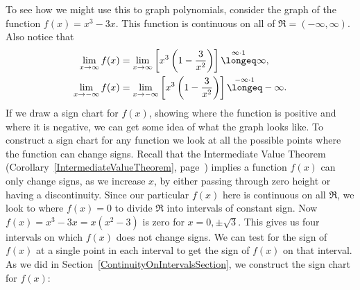 \bex\label{XXX-3XExample}
To see how we might use this to graph polynomials, consider
the graph of the function $f(x)=x^3-3x$.
This function is continuous on all of $\Re=(-\infty,\infty)$.
Also notice that
\begin{align*}
\lim_{x\to\infty}f(x)&=\lim_{x\to\infty}\left[x^3\left(1-\frac3{x^2}\right)
               \right]\overset{\infty\cdot1}{\longeq}\infty,\\
\lim_{x\to-\infty}f(x)&=\lim_{x\to-\infty}\left[x^3\left(1-\frac3{x^2}\right)
               \right]\overset{-\infty\cdot1}{\longeq}-\infty.\end{align*}
If we draw a sign chart for $f(x)$, showing where the function
is positive and where it is negative, we can get some
idea of what the graph looks like.  To construct a sign chart
for any function we look at all the
possible points where the function can change signs. Recall that
the Intermediate Value Theorem (Corollary~\ref{IntermediateValueTheorem},
page~\pageref{IntermediateValueTheorem})
implies a function $f(x)$ can only change signs, as we increase $x$,
by either passing through zero height or having a discontinuity.
Since our particular $f(x)$ here is continuous on all $\Re$,
we look to where $f(x)=0$ to divide $\Re$ into intervals of constant sign.
Now $f(x)=x^3-3x=x(x^2-3)$ is zero for $x=0,\pm\sqrt3$.  This
gives us four intervals on which $f(x)$ does not change signs.
We can test for the sign of $f(x)$ at a single point in each interval
to get the sign of $f(x)$ on that interval.  As we did 
in Section~\ref{ContinuityOnIntervalsSection}, we construct
the sign chart for $f(x)$:

